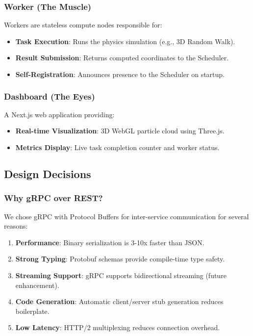 \subsubsection{Worker (The Muscle)}
Workers are stateless compute nodes responsible for:
\begin{itemize}
    \item \textbf{Task Execution}: Runs the physics simulation (e.g., 3D Random Walk).
    \item \textbf{Result Submission}: Returns computed coordinates to the Scheduler.
    \item \textbf{Self-Registration}: Announces presence to the Scheduler on startup.
\end{itemize}

\subsubsection{Dashboard (The Eyes)}
A Next.js web application providing:
\begin{itemize}
    \item \textbf{Real-time Visualization}: 3D WebGL particle cloud using Three.js.
    \item \textbf{Metrics Display}: Live task completion counter and worker status.
\end{itemize}

\subsection{Design Decisions}

\subsubsection{Why gRPC over REST?}
We chose gRPC with Protocol Buffers for inter-service communication for several reasons:
\begin{enumerate}
    \item \textbf{Performance}: Binary serialization is 3-10x faster than JSON.
    \item \textbf{Strong Typing}: Protobuf schemas provide compile-time type safety.
    \item \textbf{Streaming Support}: gRPC supports bidirectional streaming (future enhancement).
    \item \textbf{Code Generation}: Automatic client/server stub generation reduces boilerplate.
    \item \textbf{Low Latency}: HTTP/2 multiplexing reduces connection overhead.
\end{enumerate}

